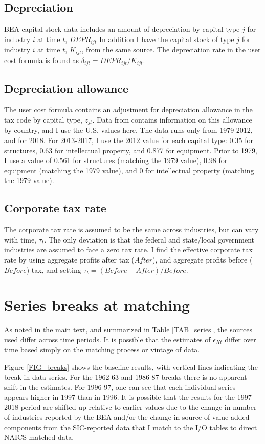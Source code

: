\documentclass[11pt]{article}
\begin{document}
\subsection{Depreciation}
BEA capital stock data \citep{beacap} includes an amount of depreciation by capital type $j$ for industry $i$ at time $t$, $DEPR_{ijt}$ In addition I have the capital stock of type $j$ for industry $i$ at time $t$, $K_{ijt}$, from the same source. The depreciation rate in the user cost formula is found as $\delta_{ijt} = DEPR_{ijt}/K_{ijt}$.

\subsection{Depreciation allowance}
The user cost formula contains an adjustment for depreciation allowance in the tax code by capital type, $z_{jt}$. Data from \cite{taxallow} contains information on this allowance by country, and I use the U.S. values here. The data runs only from 1979-2012, and for 2018. For 2013-2017, I use the 2012 value for each capital type: 0.35 for structures, 0.63 for intellectual property, and 0.877 for equipment. Prior to 1979, I use a value of 0.561 for structures (matching the 1979 value), 0.98 for equipment (matching the 1979 value), and 0 for intellectual property (matching the 1979 value). 

\subsection{Corporate tax rate}
The corporate tax rate is assumed to be the same across industries, but can vary with time, $\tau_t$. The only deviation is that the federal and state/local government industries are assumed to face a zero tax rate. I find the effective corporate tax rate by using aggregate profits after tax ($After$), and aggregate profits before ($Before$) tax, and setting $\tau_t = (Before - After)/Before$. 

\section{Series breaks at matching}
As noted in the main text, and summarized in Table \ref{TAB_series}, the sources used differ across time periods. It is possible that the estimates of $\epsilon_{Kt}$ differ over time based simply on the matching process or vintage of data. 

Figure \ref{FIG_breaks} shows the baseline results, with vertical lines indicating the break in data series. For the 1962-63 and 1986-87 breaks there is no apparent shift in the estimates. For 1996-97, one can see that each individual series appears higher in 1997 than in 1996. It is possible that the results for the 1997-2018 period are shifted up relative to earlier values due to the change in number of industries reported by the BEA and/or the change in source of value-added components from the SIC-reported data that I match to the I/O tables to direct NAICS-matched data. 
\end{document}
